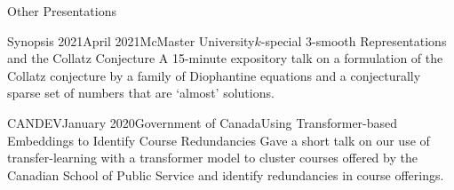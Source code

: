 \begin{rSection}{Other Presentations}

\begin{rSubsection}{Synopsis 2021}{April 2021}{McMaster University}{$k$-special $3$-smooth Representations and the Collatz Conjecture}
	A 15-minute expository talk on a formulation of the Collatz conjecture by a family of Diophantine equations and a conjecturally sparse set of numbers that are `almost' solutions.
\end{rSubsection}
\smallskip

\begin{rSubsection}{CANDEV}{January 2020}{Government of Canada}{Using Transformer-based Embeddings to  Identify Course Redundancies}
	Gave a short talk on our use of transfer-learning with a transformer model to cluster courses offered by the Canadian School of Public Service and identify redundancies in course offerings.
\end{rSubsection}
\smallskip







\end{rSection}
